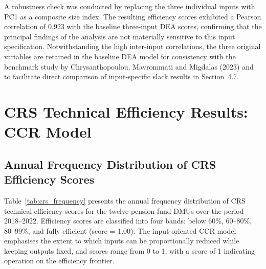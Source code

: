\documentclass[12pt,a4paper]{article}
\begin{document}
A robustness check was conducted by replacing the three individual inputs with PC1 as a composite size index. The resulting efficiency scores exhibited a Pearson correlation of 0.923 with the baseline three-input DEA scores, confirming that the principal findings of the analysis are not materially sensitive to this input specification. Notwithstanding the high inter-input correlations, the three original variables are retained in the baseline DEA model for consistency with the benchmark study by Chrysanthopoulou, Mavrommati and Migdalas (2023) and to facilitate direct comparison of input-specific slack results in Section~4.7.

\section{CRS Technical Efficiency Results: CCR Model}

\subsection{Annual Frequency Distribution of CRS Efficiency Scores}

Table~\ref{tab:crs_frequency} presents the annual frequency distribution of CRS technical efficiency scores for the twelve pension fund DMUs over the period 2018--2022. Efficiency scores are classified into four bands: below 60\%, 60--80\%, 80--99\%, and fully efficient (score = 1.00). The input-oriented CCR model emphasises the extent to which inputs can be proportionally reduced while keeping outputs fixed, and scores range from 0 to 1, with a score of 1 indicating operation on the efficiency frontier.
\end{document}
